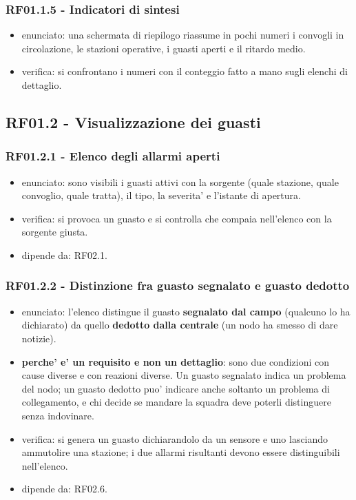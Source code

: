 \documentclass[11pt]{article}
\begin{document}
\subsubsection{RF01.1.5 - Indicatori di sintesi}
\label{sec:org7dc0f9e}
\begin{itemize}
\item enunciato: una schermata di riepilogo riassume in pochi numeri i convogli in circolazione, le
stazioni operative, i guasti aperti e il ritardo medio.
\item verifica: si confrontano i numeri con il conteggio fatto a mano sugli elenchi di dettaglio.
\end{itemize}
\subsection{RF01.2 - Visualizzazione dei guasti}
\label{sec:org18627e5}
\subsubsection{RF01.2.1 - Elenco degli allarmi aperti}
\label{sec:orge153f8c}
\begin{itemize}
\item enunciato: sono visibili i guasti attivi con la sorgente (quale stazione, quale convoglio, quale
tratta), il tipo, la severita' e l'istante di apertura.
\item verifica: si provoca un guasto e si controlla che compaia nell'elenco con la sorgente giusta.
\item dipende da: RF02.1.
\end{itemize}
\subsubsection{RF01.2.2 - Distinzione fra guasto segnalato e guasto dedotto}
\label{sec:org700dff5}
\begin{itemize}
\item enunciato: l'elenco distingue il guasto \textbf{segnalato dal campo} (qualcuno lo ha dichiarato) da quello
\textbf{dedotto dalla centrale} (un nodo ha smesso di dare notizie).
\item \textbf{perche' e' un requisito e non un dettaglio}: sono due condizioni con cause diverse e con reazioni
diverse. Un guasto segnalato indica un problema del nodo; un guasto dedotto puo' indicare anche
soltanto un problema di collegamento, e chi decide se mandare la squadra deve poterli distinguere
senza indovinare.
\item verifica: si genera un guasto dichiarandolo da un sensore e uno lasciando ammutolire una stazione;
i due allarmi risultanti devono essere distinguibili nell'elenco.
\item dipende da: RF02.6.
\end{itemize}
\end{document}
